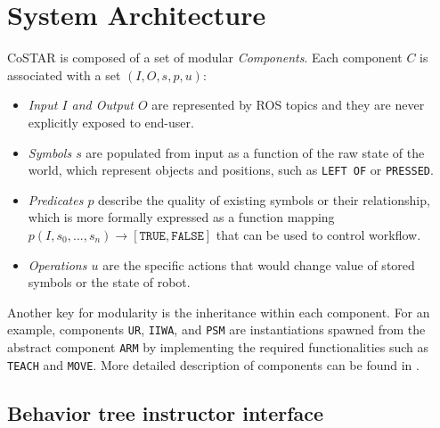 \documentclass[letterpaper, 10 pt, conference]{ieeeconf}
\begin{document}
\section{System Architecture}
CoSTAR is composed of a set of modular \textit{Components}. Each component $C$ is associated with a set $(I,O,s,p,u)$: 

\begin{itemize}
\item \textit{Input $I$ and Output $O$} are represented by ROS topics and they are never explicitly exposed to end-user. 
\item \textit{Symbols $s$} are populated from input as a function of the raw state of the world, which represent objects and positions, such as \texttt{LEFT OF} or \texttt{PRESSED}.
\item \textit{Predicates $p$} describe the quality of existing symbols or their relationship, which is more formally expressed as a function mapping $p(I,s_0, ..., s_n) \rightarrow [\texttt{TRUE}, \texttt{FALSE}]$ that can be used to control workflow. 
\item \textit{Operations $u$} are the specific actions that would change value of stored symbols or the state of robot. 

\end{itemize}

Another key for modularity is the inheritance within each component. For an example, components \texttt{UR}, \texttt{IIWA}, and \texttt{PSM} are instantiations spawned from the abstract component \texttt{ARM} by implementing the required functionalities such as \texttt{TEACH} and \texttt{MOVE}. More detailed description of components can be found in \cite{paxton2017costar}.

\subsection{Behavior tree instructor interface}
\end{document}

